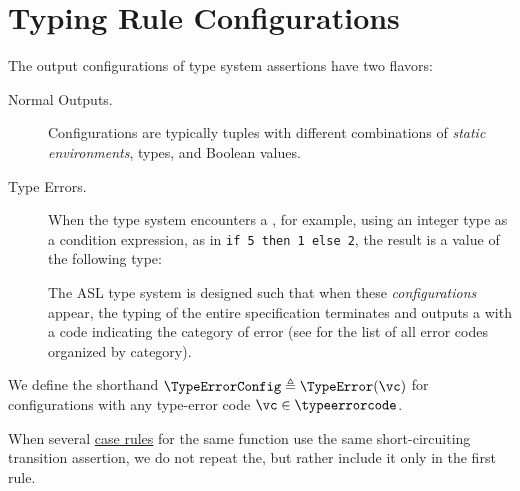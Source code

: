 \section{Typing Rule Configurations\label{sec:Typing Rule Configurations}}
The output configurations of type system assertions have two flavors:
\begin{description}
  \item[Normal Outputs.]
  Configurations are typically tuples with different combinations
  of \emph{static environments}, types, and Boolean values.

  \item[Type Errors.] When the type system encounters a \typingerrorterm{},
  for example, using an integer type as a condition expression, as in \verb|if 5 then 1 else 2|,
  the result is a value of the following type:

  The ASL type system is designed such that when these \emph{\typingerrorterm{} configurations} appear,
  the typing of the entire specification terminates and outputs a \typingerrorterm{} with a code indicating
  the category of error (see  for the list of all error codes organized by category).
\end{description}

\BackupOriginalType{
\[
  \typeerror \triangleq \{\TypeErrorVal{\vs} \;|\; \vs \in \Strings \}
\]
}
\hypertarget{type-TypeErrorconfig}{}
We define the shorthand $\TypeErrorConfig \triangleq \TypeError(\vc)$ for \typingerrorterm{} configurations
with any type-error code $\vc \in \typeerrorcode$.

When several \hyperlink{def-caserules}{case rules} for the same function use the same short-circuiting transition assertion,
we do not repeat the\ProseOrTypeError, but rather include it only in the first rule.
